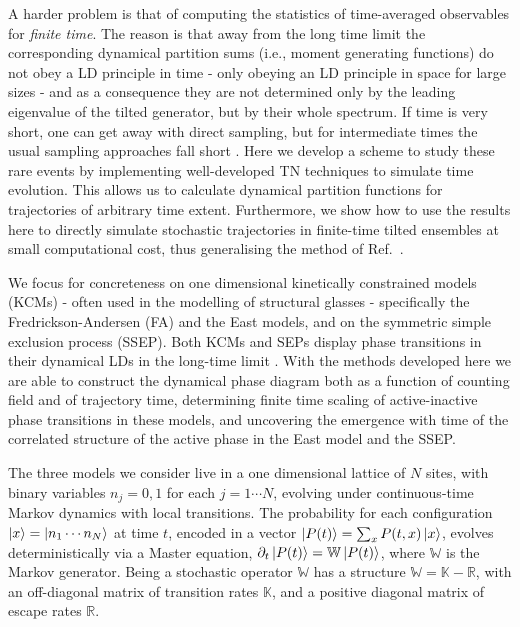 \documentclass[prl,showpacs,superscriptaddress,twocolumn,longbibliography]{revtex4-1}
\begin{document}
A harder problem is that of computing the statistics of time-averaged observables for {\em finite time}. The reason is that away from the long time limit the corresponding dynamical partition sums (i.e., moment generating functions) do not obey a LD principle in time - only obeying an LD principle in space for large sizes - and as a consequence they are not determined only by the leading eigenvalue of the tilted generator, but by their whole spectrum. If time is very short, one can get away with direct sampling, but for intermediate times the usual sampling approaches fall short \cite{Causer2021}. Here we develop a scheme to study these rare events by implementing well-developed TN techniques to simulate time evolution. This allows us to calculate dynamical partition functions for trajectories of arbitrary time extent. Furthermore, we show how to use the results here to directly simulate stochastic trajectories in finite-time tilted ensembles at small computational cost, thus generalising the method of Ref.~\cite{Causer2021}.

We focus for concreteness on one dimensional kinetically constrained models (KCMs) - often used in the modelling of structural glasses \cite{Ritort2003, Chandler2010, Garrahan2011, Garrahan2018} - specifically the Fredrickson-Andersen (FA) \cite{Fredrickson1984} and the East \cite{Jackle1991} models, and on the symmetric simple exclusion process (SSEP). Both KCMs and SEPs display phase transitions in their dynamical LDs in the long-time limit \cite{Garrahan2007, Bodineau2007, Appert-Rolland2008, Garrahan2009, Bodineau2012, Jack2015, Karevski2017}. With the methods developed here we are able to construct the dynamical phase diagram both as a function of counting field and of trajectory time, determining finite time scaling of active-inactive phase transitions in these models, and uncovering the emergence with time of the correlated structure of the active phase in the East model and the SSEP.

\smallskip

The three models we consider live in a one dimensional lattice of $N$ sites, with binary variables $n_{j}=0, 1$ for each $j = 1\cdots N$, evolving under continuous-time Markov dynamics with local transitions. The probability for each configuration $\ket{x} = \ket{n_{1}\cdots n_{N}}$ at time $t$, encoded in a vector $\ket{P(t)} = \sum_{x}P(t, x)\ket{x}$, evolves deterministically via a Master equation, 
$\partial_t \ket{P(t)} = \mathbb{W} \ket{P(t)}$, where $\mathbb{W}$ is the Markov generator. Being a stochastic operator $\mathbb{W}$ has a structure $\mathbb{W} = \mathbb{K} - \mathbb{R}$, with an off-diagonal matrix of transition rates $\mathbb{K}$, and a positive diagonal matrix of escape rates $\mathbb{R}$. 
\end{document}
